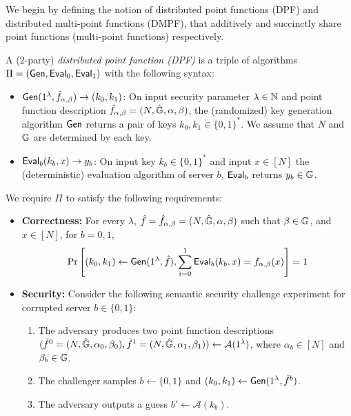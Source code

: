 We begin by defining the notion of distributed point functions (DPF) and distributed multi-point functions (DMPF), that additively and succinctly share point functions (multi-point functions) respectively. 
\begin{definition}\label{def:dpf}
A 
(2-party)
\emph{distributed point function (DPF)}
is a triple of algorithms %
$\Pi=({\sf Gen},{\sf Eval}_0,{\sf Eval}_1)$
with the following syntax: 
\begin{itemize}
    \item ${\sf Gen}(1^\lambda,\hat{f}_{\alpha,\beta})\rightarrow (k_0,k_1)$: On input security parameter $\lambda\in\mathbb{N}$ and point function description $\hat{f}_{\alpha,\beta}=(N,\hat{\mathbb{G}},\alpha,\beta)$, the (randomized) key generation algorithm ${\sf Gen}$ returns a pair of keys $k_0,k_1\in\{0,1\}^*$. 
    We assume that $N$ and $\mathbb{G}$ are determined by each key.
    \item ${\sf Eval}_b(k_b,x)\rightarrow y_b$: On input key $k_b\in\{0,1\}^*$ and input $x\in[N]$ the (deterministic) evaluation algorithm of server $b$, ${\sf Eval}_b$ returns 
    $y_b\in\mathbb{G}$.
\end{itemize}
We require $\Pi$ to satisfy the following requirements:
\begin{itemize}
    \item \textbf{Correctness:} For every $\lambda$, $\hat{f}=\hat{f}_{\alpha,\beta}=(N,\hat{\mathbb{G}},\alpha,\beta)$ such that $\beta\in\mathbb{G}$, and $x\in[N]$, for $b=0,1$,  
    $$\Pr\left[(k_0,k_1)\leftarrow{\sf Gen}(1^\lambda,\hat{f}), \sum_{i=0}^{1}{\sf Eval}_b(k_b,x)=f_{\alpha,\beta}(x)\right]=1$$
    \item \textbf{Security:} Consider the following semantic security challenge experiment for corrupted server $b\in\{0,1\}$:
    \begin{enumerate}
        \item The adversary produces two point function descriptions $(\hat{f}^0=(N,\hat{\mathbb{G}},\alpha_0,\beta_0),\hat{f}^1=(N,\hat{\mathbb{G}},\alpha_1,\beta_1))\leftarrow\mathcal{A}(1^\lambda)$, where $\alpha_b\in[N]$ and $\beta_b\in\mathbb{G}$.
        \item The challenger samples $b\gets\{0,1\}$ and $(k_0,k_1)\leftarrow{\sf Gen}(1^\lambda,\hat{f}^b)$.
        \item The adversary outputs a guess $b'\leftarrow\mathcal{A}(k_b)$.
    \end{enumerate}

\end{itemize}
\end{definition}
